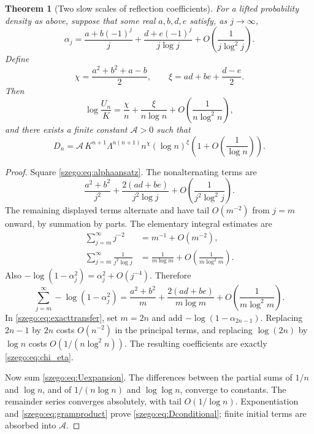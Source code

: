 \documentclass[11pt,a4paper]{article}
\numberwithin{equation}{section}
\newtheorem{theorem}{Theorem}[section]
\theoremstyle{remark}\newtheorem{remark}[theorem]{Remark}
\newcommand{\Lam}{\Lambda}
\begin{document}
\begin{theorem}[Two slow scales of reflection coefficients]\label{szego:thm:transfer}
For a lifted probability density as above, suppose that some real
$a,b,d,e$ satisfy, as $j\to\infty$,
\begin{equation}\label{szego:eq:alphaansatz}
 \alpha_j=\frac{a+b(-1)^j}{j}
       +\frac{d+e(-1)^j}{j\log j}
       +O\!\left(\frac1{j\log^2 j}\right).
\end{equation}
Define
\begin{equation}\label{szego:eq:chi_eta}
 \chi=\frac{a^2+b^2+a-b}{2},\qquad
 \xi=ad+be+\frac{d-e}{2}.
\end{equation}
Then
\begin{equation}\label{szego:eq:Uexpansion}
 \log\frac{U_n}{K}
 =\frac\chi n+\frac\xi{n\log n}
  +O\!\left(\frac1{n\log^2n}\right),
\end{equation}
and there exists a finite constant $\mathcal A>0$ such that
\begin{equation}\label{szego:eq:Dconditional}
 D_n=\mathcal A\,K^{n+1}\Lam^{n(n+1)}n^\chi(\log n)^\xi
       \left(1+O\!\left(\frac1{\log n}\right)\right).
\end{equation}
\end{theorem}
\begin{proof}
Square \eqref{szego:eq:alphaansatz}. The nonalternating terms are
\[
 \frac{a^2+b^2}{j^2}+\frac{2(ad+be)}{j^2\log j}
      +O\!\left(\frac1{j^2\log^2j}\right).
\]
The remaining displayed terms alternate and have tail $O(m^{-2})$ from
$j=m$ onward, by summation by parts. The elementary integral estimates are
\begin{align*}
 \sum_{j=m}^\infty j^{-2}&=m^{-1}+O(m^{-2}),\\
 \sum_{j=m}^\infty\frac1{j^2\log j}
 &=\frac1{m\log m}+O\!\left(\frac1{m\log^2m}\right).
\end{align*}
Also $-\log(1-\alpha_j^2)=\alpha_j^2+O(j^{-4})$.
Therefore
\[
 \sum_{j=m}^\infty-\log(1-\alpha_j^2)
 =\frac{a^2+b^2}{m}+\frac{2(ad+be)}{m\log m}
  +O\!\left(\frac1{m\log^2m}\right).
\]
In \eqref{szego:eq:exacttransfer}, set $m=2n$ and add
$-\log(1-\alpha_{2n-1})$.
Replacing $2n-1$ by $2n$ costs $O(n^{-2})$ in the principal terms, and
replacing $\log(2n)$ by $\log n$ costs $O(1/(n\log^2n))$.
The resulting coefficients are exactly \eqref{szego:eq:chi_eta}.

Now sum \eqref{szego:eq:Uexpansion}. The differences between the partial sums
of $1/n$ and $\log n$, and of $1/(n\log n)$ and $\log\log n$, converge to
constants. The remainder series converges absolutely, with tail
$O(1/\log n)$. Exponentiation and \eqref{szego:eq:gramproduct} prove
\eqref{szego:eq:Dconditional}; finite initial terms are absorbed into $\mathcal A$.
\end{proof}
\end{document}
